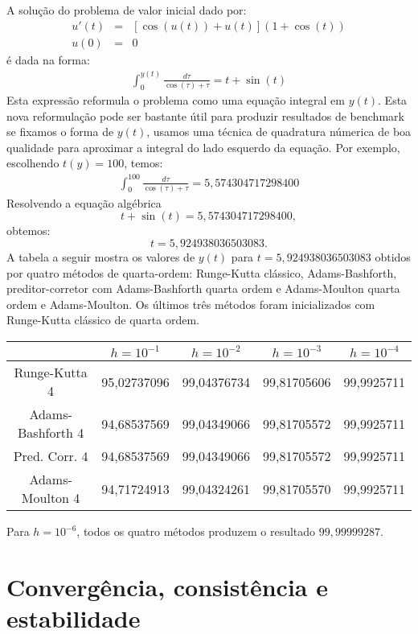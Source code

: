  \begin{ex} A solução do problema de valor inicial dado por:
\begin{eqnarray*}
u'(t)&=&\left[\cos\left(u(t)\right)+u(t)\right](1+\cos(t))\\
u(0)&=&0
\end{eqnarray*}
é dada na forma:
\begin{eqnarray*}
\int_0^{y(t)}\frac{d\tau}{\cos(\tau)+\tau}=t+\sin(t)
\end{eqnarray*}
Esta expressão reformula o problema como uma equação integral em $y(t)$. Esta nova reformulação pode ser bastante útil para produzir resultados de benchmark se fixamos o forma de $y(t)$, usamos uma técnica de quadratura númerica de boa qualidade para aproximar a integral do lado esquerdo da equação. Por exemplo, escolhendo $t(y)=100$, temos:
\begin{eqnarray*}
\int_0^{100}\frac{d\tau}{\cos(\tau)+\tau}=5,574304717298400
\end{eqnarray*}
Resolvendo a equação algébrica 
$$t+\sin(t)=5,574304717298400,$$
obtemos:
$$t=5,924938036503083.$$
A tabela a seguir mostra os valores de $y(t)$ para $t=5,924938036503083$ obtidos por quatro métodos de quarta-ordem: Runge-Kutta clássico, Adams-Bashforth, preditor-corretor com Adams-Bashforth quarta ordem e Adams-Moulton quarta ordem e Adams-Moulton. Os últimos três métodos foram inicializados com Runge-Kutta clássico de quarta ordem.

\begin{tabular}{|c|c|c|c|c|}
 \hline
 &$h=10^{-1}$&$h=10^{-2}$&$h=10^{-3}$&$h=10^{-4}$\\
 \hline
  Runge-Kutta 4 &       95,02737096& 99,04376734& 99,81705606 & 99,9925711 \\
  \hline
  Adams-Bashforth 4 &   94,68537569& 99,04349066& 99,81705572& 99,9925711\\
  \hline
  Pred. Corr. 4 &       94,68537569& 99,04349066& 99,81705572& 99,9925711\\
  \hline
  Adams-Moulton 4 &     94,71724913& 99,04324261& 99,81705570& 99,9925711\\
\hline
 \end{tabular}
Para $h=10^{-6}$, todos os quatro métodos produzem o resultado $99,99999287$.
\end{ex}

\section{Convergência, consistência e estabilidade}

